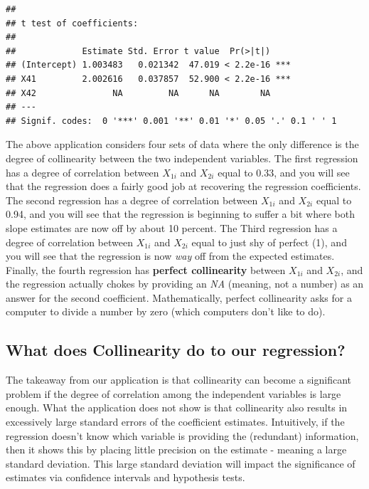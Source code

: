 \documentclass[
]{book}
\begin{document}
\begin{verbatim}
## 
## t test of coefficients:
## 
##             Estimate Std. Error t value  Pr(>|t|)    
## (Intercept) 1.003483   0.021342  47.019 < 2.2e-16 ***
## X41         2.002616   0.037857  52.900 < 2.2e-16 ***
## X42               NA         NA      NA        NA    
## ---
## Signif. codes:  0 '***' 0.001 '**' 0.01 '*' 0.05 '.' 0.1 ' ' 1
\end{verbatim}

The above application considers four sets of data where the only difference is the degree of collinearity between the two independent variables. The first regression has a degree of correlation between \(X_{1i}\) and \(X_{2i}\) equal to 0.33, and you will see that the regression does a fairly good job at recovering the regression coefficients. The second regression has a degree of correlation between \(X_{1i}\) and \(X_{2i}\) equal to 0.94, and you will see that the regression is beginning to suffer a bit where both slope estimates are now off by about 10 percent. The Third regression has a degree of correlation between \(X_{1i}\) and \(X_{2i}\) equal to just shy of perfect (1), and you will see that the regression is now \emph{way} off from the expected estimates. Finally, the fourth regression has \textbf{perfect collinearity} between \(X_{1i}\) and \(X_{2i}\), and the regression actually chokes by providing an \emph{NA} (meaning, not a number) as an answer for the second coefficient. Mathematically, perfect collinearity asks for a computer to divide a number by zero (which computers don't like to do).

\hypertarget{what-does-collinearity-do-to-our-regression}{%
\subsection{What does Collinearity do to our regression?}\label{what-does-collinearity-do-to-our-regression}}

The takeaway from our application is that collinearity can become a significant problem if the degree of correlation among the independent variables is large enough. What the application does not show is that collinearity also results in excessively large standard errors of the coefficient estimates. Intuitively, if the regression doesn't know which variable is providing the (redundant) information, then it shows this by placing little precision on the estimate - meaning a large standard deviation. This large standard deviation will impact the significance of estimates via confidence intervals and hypothesis tests.
\end{document}
